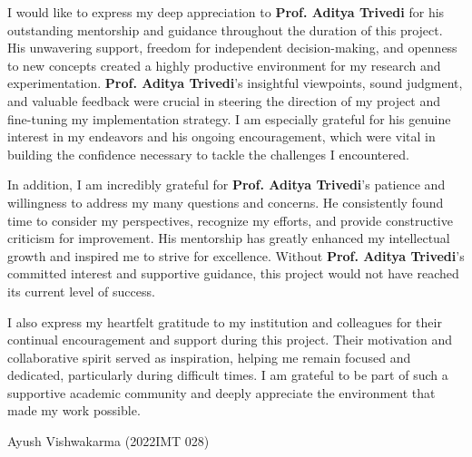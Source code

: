 \documentclass[12pt]{article}
\begin{document}
I would like to express my deep appreciation to \textbf{Prof. Aditya Trivedi} for his outstanding mentorship and guidance throughout the duration of this project. His unwavering support, freedom for independent decision-making, and openness to new concepts created a highly productive environment for my research and experimentation. \textbf{Prof. Aditya Trivedi}'s insightful viewpoints, sound judgment, and valuable feedback were crucial in steering the direction of my project and fine-tuning my implementation strategy. I am especially grateful for his genuine interest in my endeavors and his ongoing encouragement, which were vital in building the confidence necessary to tackle the challenges I encountered.

In addition, I am incredibly grateful for \textbf{Prof. Aditya Trivedi}'s patience and willingness to address my many questions and concerns. He consistently found time to consider my perspectives, recognize my efforts, and provide constructive criticism for improvement. His mentorship has greatly enhanced my intellectual growth and inspired me to strive for excellence. Without \textbf{Prof. Aditya Trivedi}'s committed interest and supportive guidance, this project would not have reached its current level of success.

I also express my heartfelt gratitude to my institution and colleagues for their continual encouragement and support during this project. Their motivation and collaborative spirit served as inspiration, helping me remain focused and dedicated, particularly during difficult times. I am grateful to be part of such a supportive academic community and deeply appreciate the environment that made my work possible.


\vspace{1cm} %

\begin{flushright} %
    Ayush Vishwakarma (2022IMT 028) \\
\end{flushright}

\cleardoublepage
\clearpage

\thispagestyle{empty}
\renewcommand{\contentsname}{Table of Contents}
\tableofcontents
\clearpage

\listoffigures
\clearpage

\end{document}
